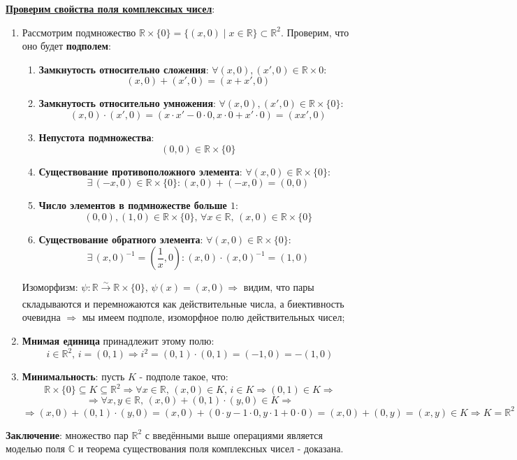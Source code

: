 \documentclass[12pt]{article}
\newcommand{\MR}{\mathbb{R}}
\newcommand{\MC}{\mathbb{C}}
\theoremstyle{definition}
\begin{document}
\textbf{\uline{Проверим свойства поля комплексных чисел}}:
\begin{enumerate}[label=\arabic*)]
	\item Рассмотрим подмножество $\MR\times\{0\} =\{(x,0) \mid x \in \MR\} \subset \MR^2$. Проверим, что оно будет \textbf{подполем}:
	\begin{enumerate}[label=(\alph*)]
		\item \textbf{Замкнутость относительно сложения}: $\forall (x,0), (x',0) \in \MR \times{0}$:
		$$
			(x,0) + (x',0) = (x + x',0)
		$$
		\item \textbf{Замкнутость относительно умножения}: $\forall (x,0), (x',0) \in \MR \times\{0\}$:
		$$
			(x,0){\cdot}(x',0) = (x{\cdot}x' - 0{\cdot}0, x{\cdot}0 + x'{\cdot}0) = (xx',0)
		$$
		\item \textbf{Непустота подмножества}:
		$$
			(0,0) \in \MR \times \{0\}
		$$
		\item \textbf{Существование противоположного элемента}: $\forall (x,0) \in \MR\times \{0\}$:
		$$
			\exists \, (-x, 0) \in \MR \times \{0\} \colon (x,0) + (-x,0) = (0,0)
		$$
		\item \textbf{Число элементов в подмножестве больше $1$}:
		$$
			(0,0), (1,0) \in \MR \times \{0\}, \, \forall x \in \MR, \, (x,0) \in \MR \times\{0\}
		$$
		\item \textbf{Существование обратного элемента}: $\forall (x,0) \in \MR\times \{0\}$:
		$$
			\exists \, (x,0)^{-1} = \left(\dfrac{1}{x},0\right) \colon (x,0){\cdot}(x,0)^{-1} = (1,0)
		$$
	\end{enumerate}
	Изоморфизм: $\psi \colon \MR \xrightarrow[]{\sim} \MR \times \{0\}, \, \psi(x) = (x,0) \Rightarrow$ видим, что пары складываются и перемножаются как действительные числа, а биективность очевидна $\Rightarrow$ мы имеем подполе, изоморфное полю действительных чисел;
	\item \textbf{Мнимая единица} принадлежит этому полю: 
	$$
		i \in \MR^2, \, i = (0,1) \Rightarrow i^2 = (0,1){\cdot}(0,1) = (-1,0) = - (1,0)
	$$
	\item \textbf{Минимальность}: пусть $K$ - подполе такое, что:
	$$
		\MR \times \{0\} \subseteq K \subseteq \MR^2 \Rightarrow \forall x \in \MR, \, (x,0) \in K, \, i \in K \Rightarrow (0,1) \in K \Rightarrow
	$$
	$$
		 \Rightarrow \forall x,y \in \MR, \, (x,0) + (0,1){\cdot}(y,0)  \in K \Rightarrow 
	$$
	$$
		\Rightarrow (x,0) + (0,1){\cdot}(y,0) = (x,0) + (0{\cdot}y - 1{\cdot}0, y{\cdot}1 + 0{\cdot}0) = (x,0) + (0,y)  = (x,y) \in K \Rightarrow K = \MR^2
	$$
\end{enumerate}
\textbf{Заключение}: множество пар $\MR^2$ с введёнными выше операциями является моделью поля $\MC$ и теорема существования поля комплексных чисел - доказана.
\end{document}
